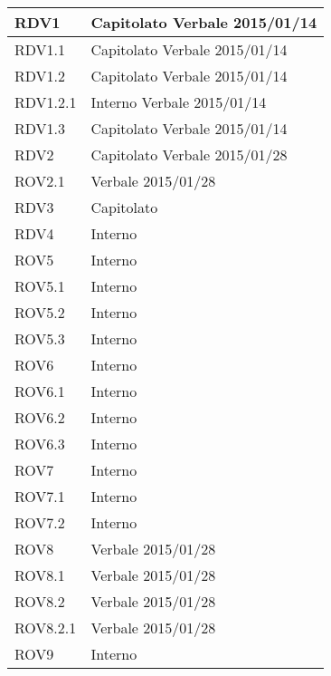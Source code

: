 \begin{center}
\begin{longtable}{| p{4cm} | p{4cm} |}
\hline
RDV1   &  Capitolato \newline Verbale 2015/01/14 \\
\hline
RDV1.1   &  Capitolato \newline Verbale 2015/01/14 \\
\hline
RDV1.2   &  Capitolato \newline Verbale 2015/01/14 \\
\hline
RDV1.2.1   &  Interno \newline Verbale 2015/01/14 \\
\hline
RDV1.3   &  Capitolato \newline Verbale 2015/01/14 \\
\hline
RDV2   &  Capitolato \newline Verbale 2015/01/28 \\
\hline
ROV2.1   &  Verbale 2015/01/28 \\
\hline
RDV3   &  Capitolato \\
\hline
RDV4   &  Interno \\
\hline
ROV5   &  Interno \\
\hline
ROV5.1   &  Interno \\
\hline
ROV5.2   &  Interno \\
\hline
ROV5.3   &  Interno \\
\hline
ROV6   &  Interno \\
\hline
ROV6.1   &  Interno \\
\hline
ROV6.2   &  Interno \\
\hline
ROV6.3   &  Interno \\
\hline
ROV7   &  Interno \\
\hline
ROV7.1   &  Interno \\
\hline
ROV7.2   &  Interno \\
\hline
ROV8   &  Verbale 2015/01/28 \\
\hline
ROV8.1   &  Verbale 2015/01/28 \\
\hline
ROV8.2   &  Verbale 2015/01/28 \\
\hline
ROV8.2.1   &  Verbale 2015/01/28 \\
\hline
ROV9   &  Interno \\
\hline
\end{longtable}
\egroup
\end{center}
